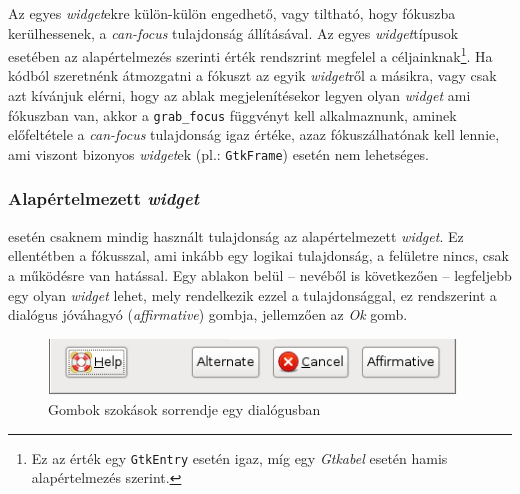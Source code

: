 Az egyes \textit{widget}ekre külön-külön engedhető, vagy tiltható, hogy fókuszba kerülhessenek, a \textit{can-focus} tulajdonság állításával. Az egyes \textit{widget}típusok esetében az alapértelmezés szerinti érték rendszrint megfelel a céljainknak\footnote{Ez az érték egy \texttt{GtkEntry} esetén igaz, míg egy \textit{Gtkabel} esetén hamis alapértelmezés szerint.}. Ha kódból szeretnénk átmozgatni a fókuszt az egyik \textit{widget}ről a másikra, vagy csak azt kívánjuk elérni, hogy az ablak megjelenítésekor legyen olyan \textit{widget} ami fókuszban van, akkor a \texttt{grab\_focus} függvényt kell alkalmaznunk, aminek előfeltétele a \textit{can-focus} tulajdonság igaz értéke, azaz fókuszálhatónak kell lennie, ami viszont bizonyos \textit{widget}ek (pl.: \texttt{GtkFrame}) esetén nem lehetséges.

\subsubsection{Alapértelmezett \textit{widget}}

 esetén csaknem mindig használt tulajdonság az alapértelmezett \textit{widget}. Ez ellentétben a fókusszal, ami inkább egy logikai tulajdonság, a felületre nincs, csak a működésre van hatással. Egy ablakon belül -- nevéből is következően -- legfeljebb egy olyan \textit{widget} lehet, mely rendelkezik ezzel a tulajdonsággal, ez rendszerint a dialógus jóváhagyó (\textit{affirmative}) gombja, jellemzően az \textit{Ok} gomb. 

\begin{figure}[H]
\begin{center}
\includegraphics[height=15mm]{images/button-affirmative.png}
\caption{Gombok szokások sorrendje egy dialógusban}
\end{center}
\end{figure}

